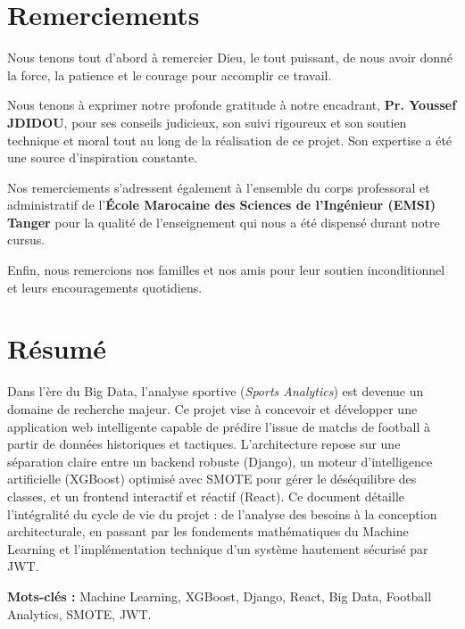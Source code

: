 \documentclass[12pt,a4paper,oneside]{book}
\begin{document}
\frontmatter

\chapter*{Remerciements}
Nous tenons tout d'abord à remercier Dieu, le tout puissant, de nous avoir donné la force, la patience et le courage pour accomplir ce travail.

Nous tenons à exprimer notre profonde gratitude à notre encadrant, \textbf{Pr. Youssef JDIDOU}, pour ses conseils judicieux, son suivi rigoureux et son soutien technique et moral tout au long de la réalisation de ce projet. Son expertise a été une source d'inspiration constante.

Nos remerciements s'adressent également à l'ensemble du corps professoral et administratif de l'\textbf{École Marocaine des Sciences de l'Ingénieur (EMSI) Tanger} pour la qualité de l'enseignement qui nous a été dispensé durant notre cursus.

Enfin, nous remercions nos familles et nos amis pour leur soutien inconditionnel et leurs encouragements quotidiens.

\chapter*{Résumé}
Dans l'ère du Big Data, l'analyse sportive (\textit{Sports Analytics}) est devenue un domaine de recherche majeur. Ce projet vise à concevoir et développer une application web intelligente capable de prédire l'issue de matchs de football à partir de données historiques et tactiques. L'architecture repose sur une séparation claire entre un backend robuste (Django), un moteur d'intelligence artificielle (XGBoost) optimisé avec SMOTE pour gérer le déséquilibre des classes, et un frontend interactif et réactif (React). Ce document détaille l'intégralité du cycle de vie du projet : de l'analyse des besoins à la conception architecturale, en passant par les fondements mathématiques du Machine Learning et l'implémentation technique d'un système hautement sécurisé par JWT.

\vspace{1cm}
\noindent\textbf{Mots-clés :} Machine Learning, XGBoost, Django, React, Big Data, Football Analytics, SMOTE, JWT.
\end{document}
